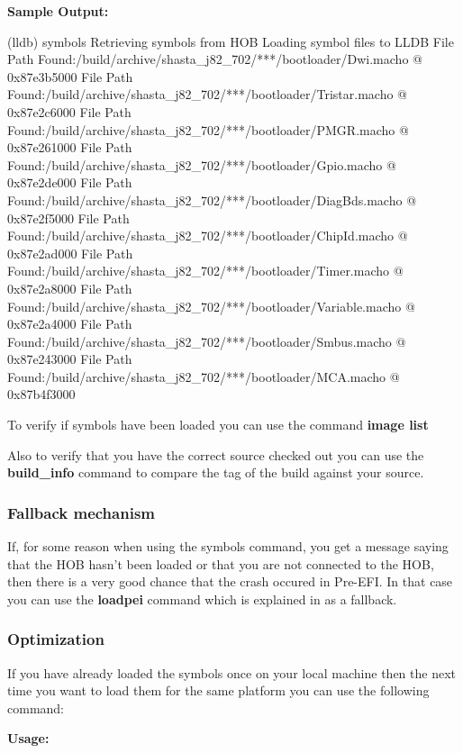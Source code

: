 \textcolor{SmokeyDarkBlue}{\bfseries Sample Output:} \\
\begin{TerminalOutput}
(lldb) symbols
Retrieving symbols from HOB
Loading symbol files to LLDB
File Path Found:/build/archive/shasta_j82_702/***/bootloader/Dwi.macho @ 0x87e3b5000
File Path Found:/build/archive/shasta_j82_702/***/bootloader/Tristar.macho @ 0x87e2c6000
File Path Found:/build/archive/shasta_j82_702/***/bootloader/PMGR.macho @ 0x87e261000
File Path Found:/build/archive/shasta_j82_702/***/bootloader/Gpio.macho @ 0x87e2de000
File Path Found:/build/archive/shasta_j82_702/***/bootloader/DiagBds.macho @ 0x87e2f5000
File Path Found:/build/archive/shasta_j82_702/***/bootloader/ChipId.macho @ 0x87e2ad000
File Path Found:/build/archive/shasta_j82_702/***/bootloader/Timer.macho @ 0x87e2a8000
File Path Found:/build/archive/shasta_j82_702/***/bootloader/Variable.macho @ 0x87e2a4000
File Path Found:/build/archive/shasta_j82_702/***/bootloader/Smbus.macho @ 0x87e243000
File Path Found:/build/archive/shasta_j82_702/***/bootloader/MCA.macho @ 0x87b4f3000
\end{TerminalOutput}

To verify if symbols have been loaded you can use the command 
\textcolor{SmokeyDarkBlue}{\bfseries image list}

Also to verify that you have the correct source checked out you can use the \textcolor{
SmokeyDarkBlue}{\bfseries build\_info} command to compare the tag of the build against 
your source.

\subsubsection{Fallback mechanism} 
If, for some reason when using the symbols command, you get a message saying that the HOB 
hasn’t been loaded or that you are not connected to the HOB, then there is a very good chance 
that the crash occured in Pre-EFI. In that case you can use the \textcolor{SmokeyDarkBlue}
{\bfseries loadpei} command which is explained in  as a fallback.

\subsubsection{Optimization}
If you have already loaded the symbols once on your local machine then the next time
you want to load them for the same platform you can use the following command:

\textcolor{SmokeyDarkBlue}{\bfseries Usage:} 

